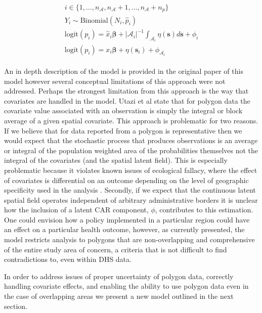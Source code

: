 \documentclass{article}
\begin{document}
\begin{align}\label{utaziModel}\begin{split}
    i \in \{1, \dots, n_{\mathcal{A}}, n_{\mathcal{A}} + 1, \dots, n_{\mathcal{A}} + n_p\}\\
    Y_i \sim \text{Binomial}(N_i, \hat{p}_i) \\
    \text{logit}(p_i) = \overset{\sim}{x}_i \boldsymbol{\beta} + |\mathcal{A}_i|^{-1} \int_{\mathcal{A}_i} \eta(\boldsymbol{s}) d\boldsymbol{s} + \phi_i \\
    \text{logit}(p_i) = x_i \boldsymbol{\beta} + \eta(\boldsymbol{s}_i) + \phi_{\mathcal{A}_i}
\end{split}\end{align}

An in depth description of the model is provided in the original paper of this model however several conceptual limitations of this approach were not addressed. Perhaps the strongest limitation from this approach is the way that covariates are handled in the model. Utazi et al state that for polygon data the covariate value associated with an observation is simply the integral or block average of a given spatial covariate. This approach is problematic for two reasons. If we believe that for data reported from a polygon is representative then we would expect that the stochastic process that produces observations is an average or integral of the population weighted area of the probabilities themselves not the integral of the covariates (and the spatial latent field). This is especially problematic because it violates known issues of ecological fallacy, where the effect of covariates is differential on an outcome depending on the level of geographic specificity used in the analysis \cite{Dark2007, Openshaw1984}. Secondly, if we expect that the continuous latent spatial field operates independent of arbitrary administrative borders it is unclear how the inclusion of a latent CAR component, $\phi$, contributes to this estimation. One could envision how a policy implemented in a particular region could have an effect on a particular health outcome, however, as currently presented, the model restricts analysis to polygons that are non-overlapping and comprehensive of the entire study area of concern, a criteria that is not difficult to find contradictions to, even within DHS data. 

In order to address issues of proper uncertainty of polygon data, correctly handling covariate effects, and enabling the ability to use polygon data even in the case of overlapping areas we present a new model outlined in the next section.
\end{document}
